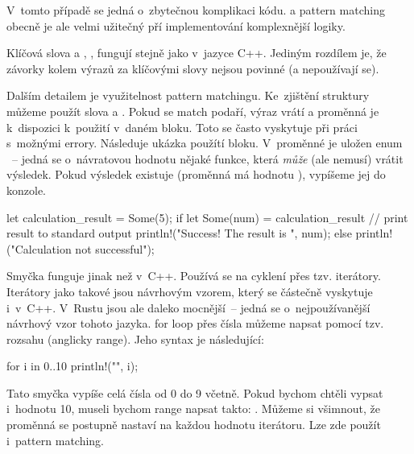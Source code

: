 \documentclass[main.tex]{subfiles}
\begin{document}
V~tomto případě se jedná o~zbytečnou komplikaci kódu.  a pattern matching
obecně je ale velmi užitečný pří implementování komplexnější logiky.



Klíčová slova  a , ,  fungují stejně
jako v~jazyce C++. Jediným rozdílem je, že závorky kolem výrazů za klíčovými slovy
nejsou povinné (a nepoužívají se).

Dalším detailem je využitelnost pattern matchingu. Ke~zjištění struktury můžeme použít
slova  a . Pokud se match podaří, výraz vrátí
 a proměnná je k~dispozici k~použití v~daném bloku. Toto se často vyskytuje
při práci s~možnými errory. Následuje ukázka použítí  bloku. V~proměnné
 je uložen enum ~-- jedná se o~návratovou
hodnotu nějaké funkce, která \emph{může} (ale nemusí) vrátit výsledek. Pokud výsledek
existuje (proměnná má hodnotu ), vypíšeme jej do konzole.

\obrazek
\begin{rustcode}
    let calculation_result = Some(5);
    if let Some(num) = calculation_result {
        // print result to standard output
        println!("Success! The result is {}", num);
    } else {
        println!("Calculation not successful");
    }
\end{rustcode}


Smyčka  funguje jinak než v~C++. Používá se na cyklení přes tzv. iterátory.
Iterátory jako takové jsou návrhovým vzorem, který se částečně vyskytuje i~v~C++.
V~Rustu jsou ale daleko mocnější~-- jedná se o~nejpoužívanější návrhový vzor tohoto
jazyka.  for loop přes čísla můžeme napsat pomocí tzv. rozsahu
(anglicky range). Jeho syntax je následující:

\obrazek
\begin{rustcode}
    for i in 0..10 {
        println!("{}", i);
    }
\end{rustcode}

Tato smyčka vypíše celá čísla od 0 do 9 včetně. Pokud bychom chtěli vypsat i~hodnotu 10,
museli bychom range napsat takto: . Můžeme si všimnout, že proměnná
 se postupně nastaví na každou hodnotu iterátoru. Lze zde použít i~pattern
matching.
\end{document}
